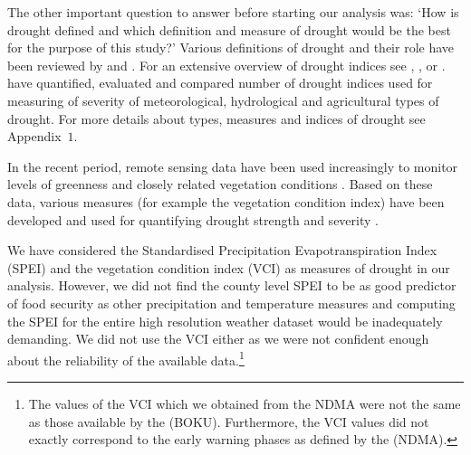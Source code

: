 \documentclass[a4paper,12pt]{article}
\begin{document}
The other important question to answer before starting our analysis was: `How is drought defined and which definition and measure of drought would be the best for the purpose of this study?' Various definitions of drought and their role have been reviewed by \cite{wilhite1985} and \cite{wilhite2000}. For an extensive overview of drought indices see \cite{Heim2002}, \cite{monacelli2005}, \cite{zargar2011} or \cite{svoboda2016}. \cite{keyantash2002} have quantified, evaluated and compared number of drought indices used for measuring of severity of meteorological, hydrological and agricultural types of drought. For more details about types, measures and indices of drought see Appendix~$1$.


In the recent period, remote sensing data have been used increasingly to monitor levels of greenness and closely related vegetation conditions \citep{nicolai2017}. Based on these data, various measures (for example the vegetation condition index) have been developed and used for quantifying drought strength and severity \citep{KlischAtz2016}. 

We have considered the Standardised Precipitation Evapotranspiration Index  (SPEI) and the vegetation condition index (VCI) as measures of drought in our analysis. However, we did not find the county level SPEI to be as good predictor of food security as other precipitation and temperature measures and computing the SPEI for the entire high resolution weather dataset would be inadequately demanding. We did not use the VCI either as we were not confident enough about the reliability of the available data.\footnote{The values of the VCI which we obtained from the NDMA were not the same as those available by the \cite{BOKU} (BOKU). Furthermore, the VCI values did not exactly correspond to the early warning phases as defined by the \cite{NDMA} (NDMA).} 
\end{document}
